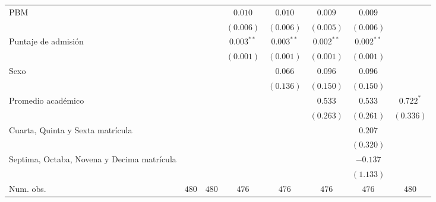 \begin{table}
\begin{center}
\begin{tabular}{l c c c c c c c}
PBM                                        &                &               & $0.010$        & $0.010$        & $0.009$       & $0.009$       &               \\
                                           &                &               & $(0.006)$      & $(0.006)$      & $(0.005)$     & $(0.006)$     &               \\
Puntaje de admisión                        &                &               & $0.003^{**}$   & $0.003^{**}$   & $0.002^{**}$  & $0.002^{**}$  &               \\
                                           &                &               & $(0.001)$      & $(0.001)$      & $(0.001)$     & $(0.001)$     &               \\
Sexo                                       &                &               &                & $0.066$        & $0.096$       & $0.096$       &               \\
                                           &                &               &                & $(0.136)$      & $(0.150)$     & $(0.150)$     &               \\
Promedio académico                         &                &               &                &                & $0.533$       & $0.533$       & $0.722^{*}$   \\
                                           &                &               &                &                & $(0.263)$     & $(0.261)$     & $(0.336)$     \\
Cuarta, Quinta y Sexta matrícula           &                &               &                &                &               & $0.207$       &               \\
                                           &                &               &                &                &               & $(0.320)$     &               \\
Septima, Octaba, Novena y Decima matrícula &                &               &                &                &               & $-0.137$      &               \\
                                           &                &               &                &                &               & $(1.133)$     &               \\
\hline
Num. obs.                                  & $480$          & $480$         & $476$          & $476$          & $476$         & $476$         & $480$         \\

\end{tabular}
\end{center}
\end{table}
